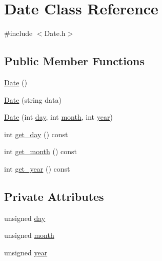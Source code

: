 \hypertarget{class_date}{}\section{Date Class Reference}
\label{class_date}


{\ttfamily \#include $<$Date.\+h$>$}

\subsection*{Public Member Functions}
\begin{DoxyCompactItemize}
\item 
\hyperlink{class_date_a4e59ed4ba66eec61c27460c5d09fa1bd}{Date} ()
\item 
\hyperlink{class_date_aed0ec4ac9e00fb6130f8a642a61180b9}{Date} (string data)
\item 
\hyperlink{class_date_ab1ad19969fa570605a6b0cd32b0da822}{Date} (int \hyperlink{class_date_a088706519330e455b4f68957d6801cde}{day}, int \hyperlink{class_date_aaa152f8b795cf43cbd17db72ad1263be}{month}, int \hyperlink{class_date_a68742ab0fdabd6dbadb5c0fdb7888f55}{year})
\item 
int \hyperlink{class_date_a86208bd42da6587c4b45ed93d688d483}{get\+\_\+day} () const
\item 
int \hyperlink{class_date_a89ae60bad421600e3ee901eb0df44975}{get\+\_\+month} () const
\item 
int \hyperlink{class_date_a9e77e9f49890449fea9aeb8114da95ff}{get\+\_\+year} () const
\end{DoxyCompactItemize}
\subsection*{Private Attributes}
\begin{DoxyCompactItemize}
\item 
unsigned \hyperlink{class_date_a088706519330e455b4f68957d6801cde}{day}
\item 
unsigned \hyperlink{class_date_aaa152f8b795cf43cbd17db72ad1263be}{month}
\item 
unsigned \hyperlink{class_date_a68742ab0fdabd6dbadb5c0fdb7888f55}{year}
\end{DoxyCompactItemize}
